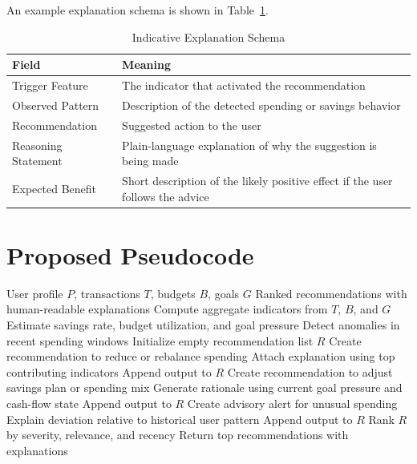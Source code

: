 \documentclass[12pt,a4paper]{report}
\begin{document}
An example explanation schema is shown in Table~\ref{tab:explainabilityschema}.

\begin{table}[H]
\centering
\caption{Indicative Explanation Schema}
\label{tab:explainabilityschema}
\begin{tabular}{p{4.2cm}p{8.8cm}}
\toprule
\textbf{Field} & \textbf{Meaning} \\
\midrule
Trigger Feature & The indicator that activated the recommendation \\
Observed Pattern & Description of the detected spending or savings behavior \\
Recommendation & Suggested action to the user \\
Reasoning Statement & Plain-language explanation of why the suggestion is being made \\
Expected Benefit & Short description of the likely positive effect if the user follows the advice \\
\bottomrule
\end{tabular}
\end{table}

\section{Proposed Pseudocode}
\begin{algorithm}[H]
\caption{Explainable Recommendation Generation}
\label{alg:recommendation}
\begin{algorithmic}[1]
\Require User profile $P$, transactions $T$, budgets $B$, goals $G$
\Ensure Ranked recommendations with human-readable explanations
\State Compute aggregate indicators from $T$, $B$, and $G$
\State Estimate savings rate, budget utilization, and goal pressure
\State Detect anomalies in recent spending windows
\State Initialize empty recommendation list $R$
        \State Create recommendation to reduce or rebalance spending
        \State Attach explanation using top contributing indicators
        \State Append output to $R$
    \EndIf
\EndFor
{}
        \State Create recommendation to adjust savings plan or spending mix
        \State Generate rationale using current goal pressure and cash-flow state
        \State Append output to $R$
    \EndIf
\EndFor
{}
    \State Create advisory alert for unusual spending
    \State Explain deviation relative to historical user pattern
    \State Append output to $R$
\EndIf
\State Rank $R$ by severity, relevance, and recency
\State Return top recommendations with explanations
\end{algorithmic}
\end{algorithm}
\end{document}
